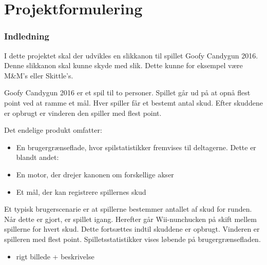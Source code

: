 \frontmatter
\maketitle
\newpage

\tableofcontents
\newpage
\listoffigures
\newpage

\mainmatter
\chapter{Projektformulering}
\subsection{Indledning}
I dette projektet skal der udvikles en slikkanon til spillet Goofy Candygun 2016. Denne slikkanon skal kunne skyde med slik. Dette kunne for eksempel være M\&M’s eller Skittle’s.

Goofy Candygun 2016 er et spil til to personer. Spillet går ud på at opnå flest point ved at ramme et mål. Hver spiller får et bestemt antal skud. Efter skuddene er opbrugt er vinderen den spiller med flest point.

Det endelige produkt omfatter:
\begin{itemize}
	\item{En brugergrænseflade, hvor spilstatistikker fremvises til deltagerne. Dette er blandt andet:}
	\item{En motor, der drejer kanonen om forskellige akser}
	\item{Et mål, der kan registrere spillernes skud}
\end{itemize}

Et typisk brugerscenarie er at spillerne bestemmer antallet af skud for runden. Når dette er gjort, er spillet igang. Herefter går Wii-nunchucken på skift mellem spillerne for hvert skud. Dette fortsættes indtil skuddene er opbrugt. Vinderen er spilleren med flest point. Spilletsstatistikker vises løbende på brugergrænsefladen. 

\begin{itemize}
	\item{rigt billede + beskrivelse}
\end{itemize}

